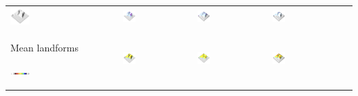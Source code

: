 \documentclass[prodmode,acmtochi]{acmsmall} %
\begin{document}
\begin{table}
{\begin{tabular}{m{} m{} m{} m{} m{}}
\includegraphics[width=0.19\textwidth]{images/render_3d/3d_novices/dem_difference_1.png} &
\includegraphics[width=0.19\textwidth]{images/render_3d/3d_novices/stdev_regression_difference_series_1.png} &
\includegraphics[width=0.19\textwidth]{images/render_3d/3d_novices/stdev_regression_difference_series_2.png} &
\includegraphics[width=0.19\textwidth]{images/render_3d/3d_novices/stdev_regression_difference_series_3.png}\\
%
Mean landforms \par \vspace{0.5em} \includegraphics[width=0.19\textwidth]{images/legends/forms_legend.pdf} & 
\includegraphics[width=0.19\textwidth]{images/render_3d/3d_novices/forms_1.png} &
\includegraphics[width=0.19\textwidth]{images/render_3d/3d_novices/mean_forms_1.png} &
\includegraphics[width=0.19\textwidth]{images/render_3d/3d_novices/mean_forms_2.png} &

\end{tabular}}
\end{table}
\end{document}
